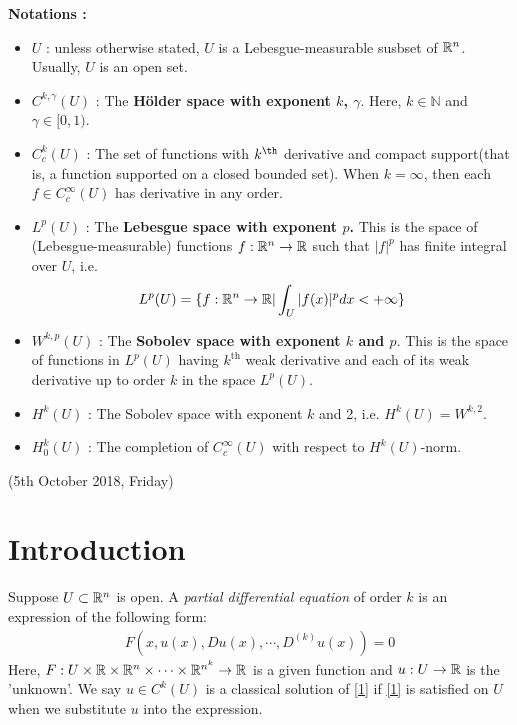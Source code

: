 \documentclass[12pt,a4paper]{report}
\begin{document}
\textbf{Notations :}
\begin{itemize}
\item $U$ : unless otherwise stated, $U$ is a Lebesgue-measurable susbset of $\mathbb{R}^n$. Usually, $U$ is an open set.
\item $C^{k, \gamma}(U)$ : The \textbf{H\"{o}lder space with exponent $k$, $\gamma$}. Here, $k\in \mathbb{N}$ and $\gamma \in [0,1)$.
\item $C^{k}_{c}(U)$ : The set of functions with $k^{\th}$ derivative and compact support(that is, a function supported on a closed bounded set). When $k= \infty$, then each $f\in C^{\infty}_c(U)$ has derivative in any order.
\item $L^p(U)$ : The \textbf{Lebesgue space with exponent $p$.} This is the space of (Lebesgue-measurable) functions $f: \mathbb{R}^n \rightarrow \mathbb{R}$ such that $|f|^p$ has finite integral over $U$, i.e.
\begin{align*}
L^p(U) = \{f : \mathbb{R}^n \rightarrow \mathbb{R} | \int_U |f(x)|^p dx < + \infty \}
\end{align*}
\item $W^{k,p}(U)$ : The \textbf{Sobolev space with exponent $k$ and $p$}. This is the space of functions in $L^p(U)$ having $k^{\text{th}}$ weak derivative and each of its weak derivative up to order $k$ in the space $L^p(U)$.
\item $H^{k}(U)$ : The Sobolev space with exponent $k$ and 2, i.e. $H^k(U) = W^{k,2}$.
\item $H^k_0(U)$ : The completion of $C_c^{\infty}(U)$ with respect to $H^{k}(U)$-norm.
\end{itemize}
\newday

(5th October 2018, Friday)

\section*{Introduction}

Suppose $U \subset \mathbb{R}^n$ is open. A \emph{partial differential equation} of order $k$ is an expression of the following form:
\begin{align}
F(x, u(x),Du(x),\cdots,D^{(k)}u(x))=0 \label{1}
\end{align}
Here, $F: U \times \mathbb{R}\times \mathbb{R}^n \times \cdots \times \mathbb{R}^{n^k} \rightarrow \mathbb{R}$ is a given function and $u : U \rightarrow \mathbb{R}$ is the 'unknown'. We say $u\in C^k(U)$ is a classical solution of \ref{1} if \ref{1} is satisfied on $U$ when we substitute $u$ into the expression.
\s
\end{document}

